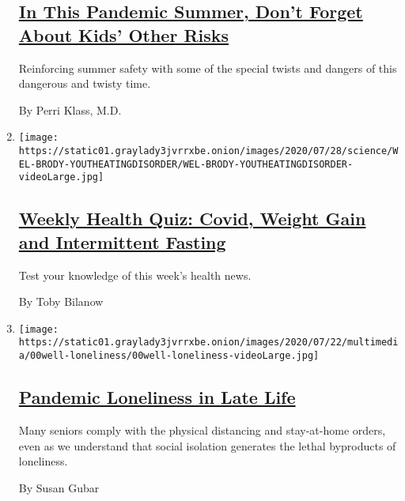 \begin{enumerate}
  \hypertarget{in-this-pandemic-summer-dont-forget-about-kids-other-risks}{%
  \subsection{\texorpdfstring{\href{/2020/08/03/well/family/children-summer-safety.html}{In
  This Pandemic Summer, Don't Forget About Kids' Other
  Risks}}{In This Pandemic Summer, Don't Forget About Kids' Other Risks}}\label{in-this-pandemic-summer-dont-forget-about-kids-other-risks}}

  Reinforcing summer safety with some of the special twists and dangers
  of this dangerous and twisty time.

  By Perri Klass, M.D.
\item
  \texttt{[image: https://static01.graylady3jvrrxbe.onion/images/2020/07/28/science/WEL-BRODY-YOUTHEATINGDISORDER/WEL-BRODY-YOUTHEATINGDISORDER-videoLarge.jpg]}

  \hypertarget{weekly-health-quiz-covid-weight-gain-and-intermittent-fasting}{%
  \subsection{\texorpdfstring{\href{/interactive/2020/07/31/well/live/31healthquiz-07312020.html}{Weekly
  Health Quiz: Covid, Weight Gain and Intermittent
  Fasting}}{Weekly Health Quiz: Covid, Weight Gain and Intermittent Fasting}}\label{weekly-health-quiz-covid-weight-gain-and-intermittent-fasting}}

  Test your knowledge of this week's health news.

  By Toby Bilanow
\item
  \texttt{[image: https://static01.graylady3jvrrxbe.onion/images/2020/07/22/multimedia/00well-loneliness/00well-loneliness-videoLarge.jpg]}

  \hypertarget{pandemic-loneliness-in-late-life}{%
  \subsection{\texorpdfstring{\href{/2020/07/30/well/mind/pandemic-loneliness-in-late-life.html}{Pandemic
  Loneliness in Late
  Life}}{Pandemic Loneliness in Late Life}}\label{pandemic-loneliness-in-late-life}}

  Many seniors comply with the physical distancing and stay-at-home
  orders, even as we understand that social isolation generates the
  lethal byproducts of loneliness.

  By Susan Gubar
\end{enumerate}

